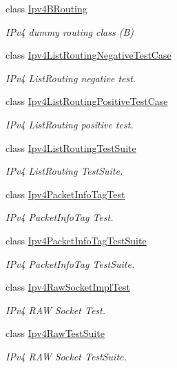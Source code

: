 \begin{DoxyCompactItemize}
class \hyperlink{classIpv4BRouting}{Ipv4\+B\+Routing}
\begin{DoxyCompactList}\small\item\em I\+Pv4 dummy routing class (B) \end{DoxyCompactList}\item 
class \hyperlink{classIpv4ListRoutingNegativeTestCase}{Ipv4\+List\+Routing\+Negative\+Test\+Case}
\begin{DoxyCompactList}\small\item\em I\+Pv4 List\+Routing negative test. \end{DoxyCompactList}\item 
class \hyperlink{classIpv4ListRoutingPositiveTestCase}{Ipv4\+List\+Routing\+Positive\+Test\+Case}
\begin{DoxyCompactList}\small\item\em I\+Pv4 List\+Routing positive test. \end{DoxyCompactList}\item 
class \hyperlink{classIpv4ListRoutingTestSuite}{Ipv4\+List\+Routing\+Test\+Suite}
\begin{DoxyCompactList}\small\item\em I\+Pv4 List\+Routing Test\+Suite. \end{DoxyCompactList}\item 
class \hyperlink{classIpv4PacketInfoTagTest}{Ipv4\+Packet\+Info\+Tag\+Test}
\begin{DoxyCompactList}\small\item\em I\+Pv4 Packet\+Info\+Tag Test. \end{DoxyCompactList}\item 
class \hyperlink{classIpv4PacketInfoTagTestSuite}{Ipv4\+Packet\+Info\+Tag\+Test\+Suite}
\begin{DoxyCompactList}\small\item\em I\+Pv4 Packet\+Info\+Tag Test\+Suite. \end{DoxyCompactList}\item 
class \hyperlink{classIpv4RawSocketImplTest}{Ipv4\+Raw\+Socket\+Impl\+Test}
\begin{DoxyCompactList}\small\item\em I\+Pv4 R\+AW Socket Test. \end{DoxyCompactList}\item 
class \hyperlink{classIpv4RawTestSuite}{Ipv4\+Raw\+Test\+Suite}
\begin{DoxyCompactList}\small\item\em I\+Pv4 R\+AW Socket Test\+Suite. \end{DoxyCompactList}\item 

\end{DoxyCompactItemize}
